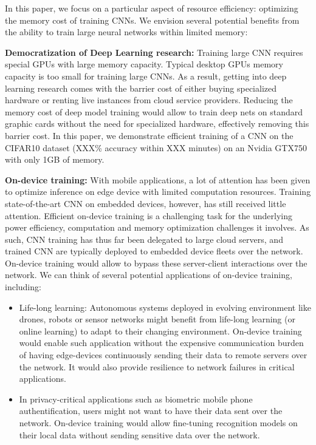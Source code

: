 \documentclass[twocolumn]{bmcart}
\begin{document}
In this paper, we focus on a particular aspect of resource efficiency: optimizing the memory cost of training CNNs. 
We envision several potential benefits from the ability to train large neural networks within limited memory:

\textbf{Democratization of Deep Learning research:} 
Training large CNN requires special GPUs with large memory capacity. 
Typical desktop GPUs memory capacity is too small for training large CNNs.
As a result, getting into deep learning research comes with the barrier cost of either buying specialized hardware or renting live instances from cloud service providers. 
Reducing the memory cost of deep model training would allow to train deep nets on standard graphic cards without the need for specialized hardware, effectively removing this barrier cost.
In this paper, we demonstrate efficient training of a CNN on the CIFAR10 dataset (XXX\% accuracy within XXX minutes) on an Nvidia GTX750 with only 1GB of memory.

\textbf{On-device training:}
With mobile applications, a lot of attention has been given to optimize inference on edge device with limited computation resources.
Training state-of-the-art CNN on embedded devices, however, has still received little attention.
Efficient on-device training is a challenging task for the underlying power efficiency, computation and memory optimization challenges it involves.
As such, CNN training has thus far been delegated to large cloud servers, and trained CNN are typically deployed to embedded device fleets over the network.  
On-device training would allow to bypass these server-client interactions over the network. 
We can think of several potential applications of on-device training, including:
\begin{itemize}
 \item Life-long learning: Autonomous systems deployed in evolving environment like drones, robots or sensor networks might benefit from life-long learning (or online learning) to adapt to their changing environment. 
On-device training would enable such application without the expensive communication burden of having edge-devices continuously sending their data to remote servers over the network. It would also provide resilience to network failures in critical applications.
 \item In privacy-critical applications such as biometric mobile phone authentification, users might not want to have their data sent over the network. 
On-device training would allow fine-tuning recognition models on their local data without sending sensitive data over the network.
\end{itemize}
\end{document}
